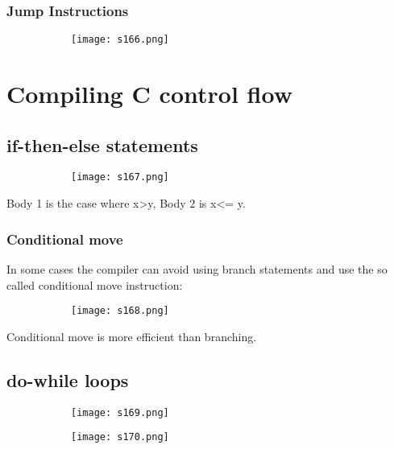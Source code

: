 \documentclass[8pt]{extreport}
\begin{document}
\subsection{Jump Instructions}
\begin{figure}[H]
\centering
\begin{subfigure}[b]{0.4\linewidth}
\texttt{[image: s166.png]}
\end{subfigure}
\end{figure}

\chapter{Compiling C control flow}

\section{if-then-else statements}
\begin{figure}[H]
\centering
\begin{subfigure}[b]{0.4\linewidth}
\texttt{[image: s167.png]}
\end{subfigure}
\end{figure}
Body 1 is the case where x>y, Body 2 is x<= y.
\subsection{Conditional move}
In some cases the compiler can avoid using branch statements and use the so called conditional move instruction:
\begin{figure}[H]
\centering
\begin{subfigure}[b]{0.4\linewidth}
\texttt{[image: s168.png]}
\end{subfigure}
\end{figure}
Conditional move is more efficient than branching.

\section{do-while loops}
\begin{figure}[H]
\centering
\begin{subfigure}[b]{0.4\linewidth}
\texttt{[image: s169.png]}
\end{subfigure}
\begin{subfigure}[b]{0.4\linewidth}
\texttt{[image: s170.png]}
\end{subfigure}
\end{figure}
\end{document}
